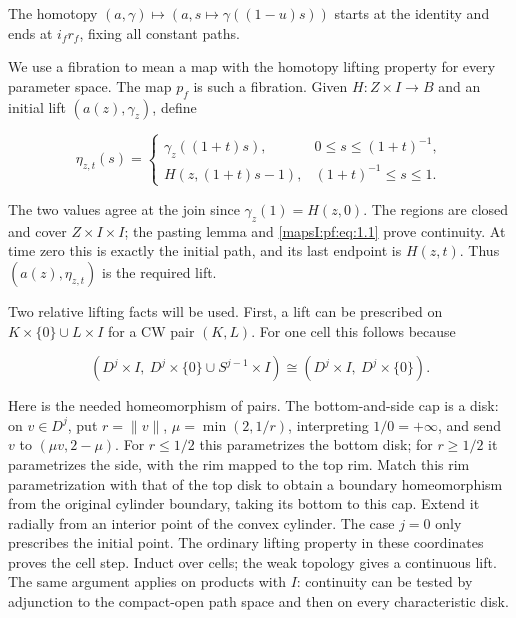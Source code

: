 The homotopy \((a,\gamma)\mapsto(a,s\mapsto\gamma((1-u)s))\) starts at the identity and ends at \(i_fr_f\), fixing all constant paths.

We use a fibration to mean a map with the homotopy lifting property for every parameter space. The map \(p_f\) is such a fibration. Given \(H:Z\times I\to B\) and an initial lift \((a(z),\gamma_z)\), define

\begin{equation}
\eta_{z,t}(s)=
\begin{cases}
\gamma_z((1+t)s),&0\leq s\leq (1+t)^{-1},\\
H(z,(1+t)s-1),&(1+t)^{-1}\leq s\leq1.
\end{cases}
\label{mapsI:pf:eq:1.4}
\end{equation}

The two values agree at the join since \(\gamma_z(1)=H(z,0)\). The regions are closed and cover \(Z\times I\times I\); the pasting lemma and \eqref{mapsI:pf:eq:1.1} prove continuity. At time zero this is exactly the initial path, and its last endpoint is \(H(z,t)\). Thus \((a(z),\eta_{z,t})\) is the required lift.

Two relative lifting facts will be used. First, a lift can be prescribed on \(K\times\{0\}\cup L\times I\) for a CW pair \((K,L)\). For one cell this follows because

\begin{equation}
(D^j\times I,\ D^j\times\{0\}\cup S^{j-1}\times I)
\cong(D^j\times I,\ D^j\times\{0\}).
\label{mapsI:pf:eq:1.5}
\end{equation}

Here is the needed homeomorphism of pairs. The bottom-and-side cap is a disk: on \(v\in D^j\), put \(r=\|v\|\), \(\mu=\min(2,1/r)\), interpreting \(1/0=+\infty\), and send \(v\) to \((\mu v,2-\mu)\). For \(r\leq1/2\) this parametrizes the bottom disk; for \(r\geq1/2\) it parametrizes the side, with the rim mapped to the top rim. Match this rim parametrization with that of the top disk to obtain a boundary homeomorphism from the original cylinder boundary, taking its bottom to this cap. Extend it radially from an interior point of the convex cylinder. The case \(j=0\) only prescribes the initial point. The ordinary lifting property in these coordinates proves the cell step. Induct over cells; the weak topology gives a continuous lift. The same argument applies on products with \(I\): continuity can be tested by adjunction to the compact-open path space and then on every characteristic disk.


